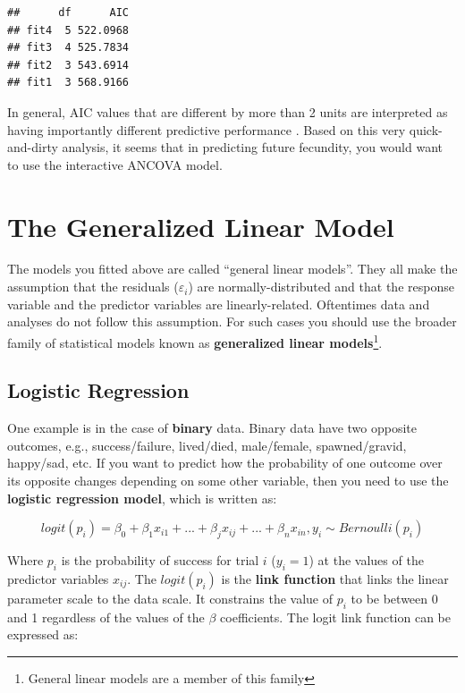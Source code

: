 \documentclass[]{book}
\let\rmarkdownfootnote\footnote%
\def\footnote{\protect\rmarkdownfootnote}
\begin{document}
\begin{verbatim}
##      df      AIC
## fit4  5 522.0968
## fit3  4 525.7834
## fit2  3 543.6914
## fit1  3 568.9166
\end{verbatim}

In general, AIC values that are different by more than 2 units are interpreted as having importantly different predictive performance \citep{aic-cite}. Based on this very quick-and-dirty analysis, it seems that in predicting future fecundity, you would want to use the interactive ANCOVA model.

\hypertarget{glms}{%
\section{The Generalized Linear Model}\label{glms}}

The models you fitted above are called ``general linear models''. They all make the assumption that the residuals (\(\varepsilon_i\)) are normally-distributed and that the response variable and the predictor variables are linearly-related. Oftentimes data and analyses do not follow this assumption. For such cases you should use the broader family of statistical models known as \textbf{generalized linear models}\footnote{General linear models are a member of this family}.

\hypertarget{logis-regression}{%
\subsection{Logistic Regression}\label{logis-regression}}

One example is in the case of \textbf{binary} data. Binary data have two opposite outcomes, e.g., success/failure, lived/died, male/female, spawned/gravid, happy/sad, etc. If you want to predict how the probability of one outcome over its opposite changes depending on some other variable, then you need to use the \textbf{logistic regression model}, which is written as:

\begin{equation}
  logit(p_i)=\beta_0 + \beta_1 x_{i1} + ... + \beta_j x_{ij}+ ... + \beta_n x_{in}, y_i \sim Bernoulli(p_i)
\label{eq:logis-reg}
\end{equation}

Where \(p_i\) is the probability of success for trial \(i\) (\(y_i = 1\)) at the values of the predictor variables \(x_{ij}\). The \(logit(p_i)\) is the \textbf{link function} that links the linear parameter scale to the data scale. It constrains the value of \(p_i\) to be between 0 and 1 regardless of the values of the \(\beta\) coefficients. The logit link function can be expressed as:
\end{document}
